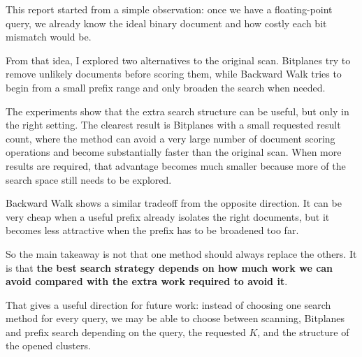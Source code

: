 This report started from a simple observation: once we have a floating-point query, we already know the ideal binary document and how costly each bit mismatch would be.

From that idea, I explored two alternatives to the original scan. Bitplanes try to remove unlikely documents before scoring them, while Backward Walk tries to begin from a small prefix range and only broaden the search when needed.

The experiments show that the extra search structure can be useful, but only in the right setting. The clearest result is Bitplanes with a small requested result count, where the method can avoid a very large number of document scoring operations and become substantially faster than the original scan. When more results are required, that advantage becomes much smaller because more of the search space still needs to be explored.

Backward Walk shows a similar tradeoff from the opposite direction. It can be very cheap when a useful prefix already isolates the right documents, but it becomes less attractive when the prefix has to be broadened too far.

So the main takeaway is not that one method should always replace the others. It is that \textbf{the best search strategy depends on how much work we can avoid compared with the extra work required to avoid it}.

That gives a useful direction for future work: instead of choosing one search method for every query, we may be able to choose between scanning, Bitplanes and prefix search depending on the query, the requested $K$, and the structure of the opened clusters.
